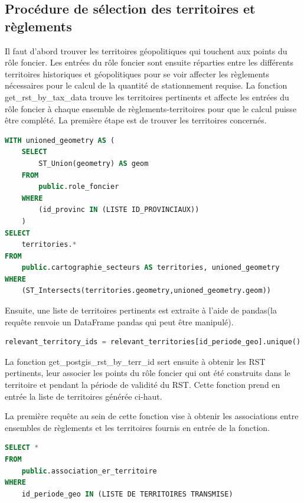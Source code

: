     \subsection{Procédure de sélection des territoires et règlements} 
        Il faut d'abord trouver les territoires géopolitiques qui touchent aux points du rôle foncier. Les entrées du rôle foncier sont ensuite réparties entre les différents territoires historiques et géopolitiques pour se voir affecter les règlements nécessaires pour le calcul de la quantité de stationnement requise. La fonction get\_rst\_by\_tax\_data trouve les territoires pertinents et affecte les entrées du rôle foncier à chaque ensemble de règlements-territoires pour que le calcul puisse être complété. La première étape est de trouver les territoires concernés.
\begin{lstlisting}[language=SQL, caption=Sélection des territoires touchant au rôle foncier]
WITH unioned_geometry AS (
    SELECT 
        ST_Union(geometry) AS geom 
    FROM 
        public.role_foncier 
    WHERE 
        (id_provinc IN (LISTE ID_PROVINCIAUX))
    )
SELECT 
    territories.* 
FROM 
    public.cartographie_secteurs AS territories, unioned_geometry 
WHERE 
    (ST_Intersects(territories.geometry,unioned_geometry.geom))
\end{lstlisting}
        Ensuite, une liste de territoires pertinents est extraite à l'aide de pandas(la requête renvoie un DataFrame pandas qui peut être manipulé).
\begin{lstlisting}[language=python, caption= Ligne de code Python pour extraire les territoires pertinents]
relevant_territory_ids = relevant_territories[id_periode_geo].unique().tolist()
\end{lstlisting}
         La fonction get\_postgis\_rst\_by\_terr\_id sert ensuite à obtenir les \ac{RST} pertinents, leur associer les points du rôle foncier qui ont été construits dans le territoire et pendant la période de validité du \ac{RST}. Cette fonction prend en entrée la liste de territoires générée ci-haut. \par 
         La première requête au sein de cette fonction vise à obtenir les associations entre ensembles de règlements et les territoires fournis en entrée de la fonction. 
\begin{lstlisting}[language=SQL, caption=Sélection des associations d'ensembles de règlements aux territoires]
SELECT * 
FROM 
    public.association_er_territoire
WHERE 
    id_periode_geo IN (LISTE DE TERRITOIRES TRANSMISE)\end{lstlisting}
